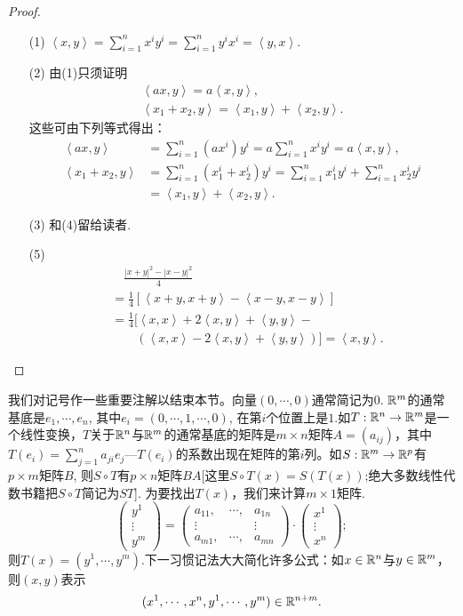 \begin{proof}
\begin{enumerate}
\item[(1)]$\left<x,y\right> = \sum\limits_{i=1}^{n}{x^iy^i} = \sum\limits_{i=1}^{n}{y^ix^i} = \left<y, x\right>$.
\item[(2)]由(1)只须证明
\begin{gather*}
\left<ax,y\right> = a\left<x,y\right>,\\
\left<x_1+x_2, y\right> = \left<x_1, y\right> + \left<x_2, y\right>.
\end{gather*}
这些可由下列等式得出：
\[
\begin{aligned}
\left<ax,y\right> &= \sum_{i=1}^{n}{(ax^i)y^i} = a\sum_{i=1}^{n}{x^iy^i} = a\left<x,y\right>,\\
\left<x_1+x_2, y\right> &= \sum_{i=1}^{n}{(x_1^i+x_2^i)y^i} = \sum_{i=1}^{n}{x_1^iy^i} + \sum_{i=1}^{n}{x_2^iy^i}\\
&= \left<x_1, y\right> + \left<x_2, y\right>.
\end{aligned}
\]
\item[(3)]和(4)留给读者.
\item[(5)]
\[
\begin{aligned}
&\quad\frac{|x+y|^2 - |x-y|^2}{4} \\
& = \frac{1}{4}[\left<x+y, x+y\right> - \left<x-y, x-y\right>]\\
& = \frac{1}{4}[\left<x, x\right> + 2\left<x, y\right> + \left<y, y\right> - \\
& \qquad (\left<x, x\right> - 2\left<x, y\right> + \left<y, y\right>)] = \left<x, y\right>.
\end{aligned}
\]
\end{enumerate}
\end{proof}

我们对记号作一些重要注解以结束本节。向量$(0, \cdots, 0)$通常简记为$0$. $\mathbb{R}^m$的通常基底是$e_1,\cdots, e_n$, 其中$e_i=(0,\cdots,1,\cdots, 0)$, 在第$i$个位置上是$1$.如$T: \mathbb{R}^n \to \mathbb{R}^m$是一个线性变换，$T$关于$\mathbb{R}^n$与$\mathbb{R}^m$的通常基底的矩阵是$m \times n$矩阵$A = (a_{ij})$，其中$T(e_i) = \sum\limits_{j=1}^{n}{a_{ji}e_j}$---$T(e_i)$的系数出现在矩阵的第$i$列。如$S:\mathbb{R}^m \to \mathbb{R}^p$有$p \times m$矩阵$B$, 则$S \circ T$有$p \times n$矩阵$BA$[这里$S \circ T(x) = S(T(x))$;绝大多数线性代数书籍把$S \circ T$简记为$ST$]. 为要找出$T(x)$，我们来计算$m \times 1$矩阵.
\[
\begin{pmatrix}
y^1\\
\vdots\\
y^m
\end{pmatrix}
=\begin{pmatrix}
a_{11}, &\cdots ,&a_{1n}\\
\vdots && \vdots \\
a_{m1}, & \cdots,&a_{mn}
\end{pmatrix}
\cdot\begin{pmatrix}
x^1\\
\vdots\\
x^n
\end{pmatrix};
\]
则$T(x)=(y^1,\cdots,y^m)$.下一习惯记法大大简化许多公式：如$x \in \mathbb{R}^n$与$y \in \mathbb{R}^m$，则$(x,y)$表示
\[
(x^1,\cdots,x^n,y^1,\cdots,y^m) \in \mathbb{R}^{n+m}.
\]

